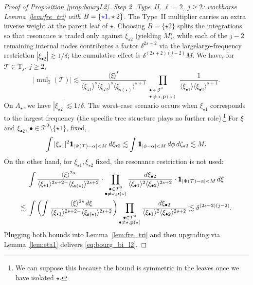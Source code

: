 \documentclass[a4paper,
11pt,  reqno]{amsart}
\newcommand{\mathbbm}[1]{\mathchoice%
    {\hbox{\sffamily 1\kern-.40em 1}}%
    {\hbox{\sffamily 1\kern-.40em 1}}%
    {\hbox{\scriptsize\sffamily 1\kern-.30em 1}}%
    {\hbox{\tiny\sffamily 1\kern-.25em 1}}}%
\newcommand{\blue}{\color{blue}}
\newcommand{\orange}{\color{orange}}
\newcommand{\jap}[1]{\langle #1 \rangle}
\newcommand{\5}{\textup{V}}
\newcommand{\noi}{\noindent}
\newcommand{\ind}{\mathbbm 1}
\theoremstyle{remark}
\newcommand{\bul}{\bullet}
\newcommand{\TT}{\mathcal{T}}
\newcommand{\Tr}{\mathrm{T}}
\newcommand{\pb}{\mathbf{p}}
\newcommand{\sbf}{\mathbf{s}}
\DeclareMathOperator{\mul}{mul}
\numberwithin{equation}{section}
\numberwithin{theorem}{section}
\begin{document}
\begin{proof}[Proof of Proposition \ref{prop:bourgL2}]
\medskip

\noi\textit{Step 2. Type~II, $\ell=2$, $j\ge 2$: workhorse Lemma~\ref{lem:fre_tri} with $B=\{{\blue \star1,}\star 2\}$.}
The Type~II multiplier carries an extra inverse weight at the parent leaf of $\star$. Choosing $B=\{\star 2\}$ splits the integrations so that resonance is traded only against $\xi_{\star 2}$ (yielding $M$), while each of the $j-2$ remaining internal nodes contributes a factor $\delta^{2s+2}$ via the {\orange large}{\blue large}-frequency restriction $|\xi_{\bul 2}|\gtrsim 1/\delta$; the cumulative effect is $\delta^{(2s+2)(j-2)}M$.
We have, for $\TT\in \Tr_j$, $j\ge 2$,
$$
|\mul_2(\TT)| \lesssim \frac{\jap{\xi}^s}{\jap{\xi_{\star1}}^{s}\jap{\xi_{\star2}}^{s}\jap{\xi_{\sbf(\star)}}^{s+1}}\prod_{\substack{\bul\in\TT^0\\\bul\neq \star, \pb(\star)}} \frac{1}{\jap{\xi_{\bul1}}\jap{\xi_{\bul2}}^{s+1}}.
$$
On $A_\star$, we have $|\xi_{\star2}|\lesssim 1/\delta$. The worst-case scenario occurs when $\xi_{\star1}$ corresponds to the largest frequency (the specific tree structure plays no further role).\footnote{We can suppose this because the bound is symmetric in the leaves once we have isolated $\star$.} For $\xi$ and $\xi_{\bul2}$, $\bul\in \TT^0\setminus\{\star1\}$, fixed,
\begin{equation}
\int |\xi_{\star1}|^2\ind_{|\Psi(\TT)-\alpha|<M} \,d\xi_{\star2} \lesssim \int \ind_{|\phi-\alpha|<M} \,d\phi\, d\zeta_{\star2} \lesssim M.
\end{equation}
On the other hand, for $\xi_{\star1},\xi_{\star2}$ fixed, the resonance restriction is not used:
\begin{align*}
&\int \frac{\jap{\xi}^{2s}}{\jap{\xi_{\star1}}^{2s+2-}\jap{\xi_{\sbf(\star)}}^{2s+2}}\cdot\prod_{\substack{\bul\in\TT^0\\\bul\neq \star, \pb(\star)}} \frac{d\xi_{\bul2}}{\jap{\xi_{\bul1}}^2\jap{\xi_{\bul2}}^{2s+2}}\cdot \ind_{|\Psi(\TT)-\alpha|<M}\, d\xi\\
\lesssim {}& \int\left(\int \frac{\jap{\xi}^{2s}\,d\xi}{\jap{\xi_{\star1}}^{2s+2-}\jap{\xi_{\sbf(\star)}}^{2s+2}}\right)\prod_{\substack{\bul\in\TT^0\\\bul\neq \star, \pb(\star)}} \frac{d\xi_{\bul2}}{\jap{\xi_{\bul1}}^2\jap{\xi_{\bul2}}^{2s+2}}  \lesssim \delta^{(2s+2)(j-2)}.
\end{align*}
Plugging both bounds into Lemma~\ref{lem:fre_tri} and then upgrading via Lemma~\ref{lem:eta1} delivers \eqref{eq:bourg_bi_l2}.

\medskip


\end{proof}
\end{document}
